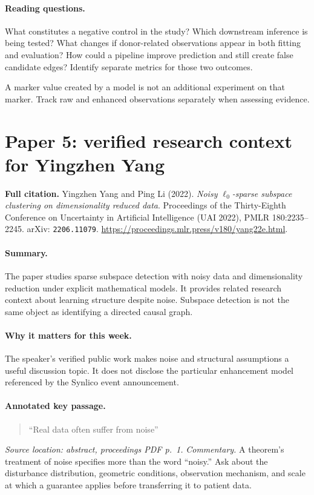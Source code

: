 \documentclass[11pt]{scrartcl}
\begin{document}
\paragraph{Reading questions.} What constitutes a negative control in the study?
Which downstream inference is being tested? What changes if donor-related observations
appear in both fitting and evaluation? How could a pipeline improve prediction and
still create false candidate edges? Identify separate metrics for those two outcomes.

\begin{pitfall}
A marker value created by a model is not an additional experiment on that marker.
Track raw and enhanced observations separately when assessing evidence.
\end{pitfall}

\clearpage
\section*{Paper 5: verified research context for Yingzhen Yang}
\textbf{Full citation.} Yingzhen Yang and Ping Li (2022).
\emph{Noisy $\ell_0$-sparse subspace clustering on dimensionality reduced data}.
Proceedings of the Thirty-Eighth Conference on Uncertainty in Artificial Intelligence
(UAI 2022), PMLR 180:2235--2245. arXiv: \texttt{2206.11079}.
\url{https://proceedings.mlr.press/v180/yang22e.html}.

\paragraph{Summary.} The paper studies sparse subspace detection with noisy data
and dimensionality reduction under explicit mathematical models. It provides related
research context about learning structure despite noise. Subspace detection is not
the same object as identifying a directed causal graph.

\paragraph{Why it matters for this week.} The speaker's verified public work makes
noise and structural assumptions a useful discussion topic. It does not disclose the
particular enhancement model referenced by the Synlico event announcement.

\paragraph{Annotated key passage.}
\begin{quote}
``Real data often suffer from noise''
\end{quote}
\emph{Source location: abstract, proceedings PDF p.~1.}
\emph{Commentary.} A theorem's treatment of noise specifies more than the word
``noisy.'' Ask about the disturbance distribution, geometric conditions, observation
mechanism, and scale at which a guarantee applies before transferring it to patient data.
\end{document}
